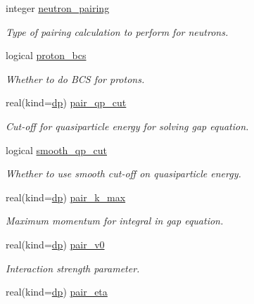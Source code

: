 \begin{DoxyCompactItemize}
integer \mbox{\hyperlink{group__INPUT__PARS_gad6072a097df429aca7d4c3daf808ceda}{neutron\+\_\+pairing}}
\begin{DoxyCompactList}\small\item\em Type of pairing calculation to perform for neutrons. \end{DoxyCompactList}\item 
logical \mbox{\hyperlink{group__INPUT__PARS_ga7478728bc2b5fc83dee2f2c21724420c}{proton\+\_\+bcs}}
\begin{DoxyCompactList}\small\item\em Whether to do B\+CS for protons. \end{DoxyCompactList}\item 
real(kind=\mbox{\hyperlink{namespaceparameters_a52f8c6351fd79345d8811e065bcbbb37}{dp}}) \mbox{\hyperlink{group__INPUT__PARS_gaddd04025cfa9a151f25211259364f404}{pair\+\_\+qp\+\_\+cut}}
\begin{DoxyCompactList}\small\item\em Cut-\/off for quasiparticle energy for solving gap equation. \end{DoxyCompactList}\item 
logical \mbox{\hyperlink{group__INPUT__PARS_ga20f7226ffbb05232c930c81d83afee32}{smooth\+\_\+qp\+\_\+cut}}
\begin{DoxyCompactList}\small\item\em Whether to use smooth cut-\/off on quasiparticle energy. \end{DoxyCompactList}\item 
real(kind=\mbox{\hyperlink{namespaceparameters_a52f8c6351fd79345d8811e065bcbbb37}{dp}}) \mbox{\hyperlink{group__INPUT__PARS_ga0d7d7715270e262c6f4e02633947b548}{pair\+\_\+k\+\_\+max}}
\begin{DoxyCompactList}\small\item\em Maximum momentum for integral in gap equation. \end{DoxyCompactList}\item 
real(kind=\mbox{\hyperlink{namespaceparameters_a52f8c6351fd79345d8811e065bcbbb37}{dp}}) \mbox{\hyperlink{group__INPUT__PARS_gaecd0609846081f6a90f49cc0f162c9cd}{pair\+\_\+v0}}
\begin{DoxyCompactList}\small\item\em Interaction strength parameter. \end{DoxyCompactList}\item 
real(kind=\mbox{\hyperlink{namespaceparameters_a52f8c6351fd79345d8811e065bcbbb37}{dp}}) \mbox{\hyperlink{group__INPUT__PARS_gacd8c346f8b069e0dca502d57557b21e7}{pair\+\_\+eta}}

\end{DoxyCompactItemize}
